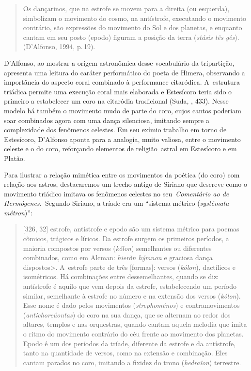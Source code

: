 \begin{quote}
Os dançarinos, que na estrofe se movem para a direita (ou esquerda),
simbolizam o movimento do cosmo, na antístrofe, executando o movimento
contrário, são expressões do movimento do Sol e dos planetas, e enquanto
cantam em seu posto (epodo) figuram a posição da terra (\emph{stásis tês
gês}). (D'Alfonso, 1994, p.\,19).
\end{quote}

 

D'Alfonso, ao mostrar a origem astronômica desse vocabulário da
tripartição, apresenta uma leitura do caráter performático do poeta de
Himera, observando a importância do aspecto coral combinado à
performance citaródica. A~estrutura triádica permite uma execução coral
mais elaborada e Estesícoro teria sido o primeiro a estabelecer um coro
na citaródia tradicional (Suda, , 433). Nesse modelo há também o
movimento mudo de parte do coro, cujos cantos poderiam soar combinados
agora com uma dança silenciosa, imitando sempre a complexidade dos
fenômenos celestes. Em seu exímio trabalho em torno de Estesícoro,
D'Alfonso aponta para a analogia, muito valiosa, entre o movimento
celeste e o do coro, reforçando elementos de religião~astral em
Estesícoro e em Platão.

Para ilustrar a relação mimética entre os movimentos da poética (do
coro) com relação aos astros, destacaremos um trecho antigo de Siriano
que descreve como o movimento triádico imitava os fenômenos celestes no
seu~\emph{Comentário ao de Hermógenes.~}Segundo Siriano, a tríade era um
``sistema métrico (\emph{systémata métron})'':

 

\begin{quote}
[326, 32] estrofe, antístrofe e epodo são um sistema métrico para
poemas cômicos, trágicos e líricos. Da estrofe surgem os primeiros
períodos, a maioria compostos por versos (\emph{kólon}) semelhantes ou
diferentes combinados, como em Alcman: \emph{hieròn hýmnon} e graciosa dança
dispostos\textgreater{}. A~estrofe parte de três [formas]: versos
(\emph{kólon}), dactílicos e isométricos. Há combinações entre
dessemelhantes, quando se diz: antístrofe é aquilo que vem depois da
estrofe, estabelecendo um período similar, semelhante à estrofe no
número e na extensão dos versos (\emph{kólon}). Esse nome é dado pelos
movimentos (\emph{strephoménos}) e contramovimentos
(\emph{antichoreúontas}) do coro na sua dança, que se alternam ao redor
dos altares, templos e nas orquestras, quando cantam aquela melodia que
imita o ritmo do movimento contrário do céu frente ao movimento dos
planetas. Epodo é um dos períodos da tríade, diferente da estrofe e da
antístrofe, tanto na quantidade de versos, como na extensão e
combinação. Eles cantam parados no coro, imitando a fixidez do trono
(\emph{hedraîon}) terrestre.
\end{quote}

